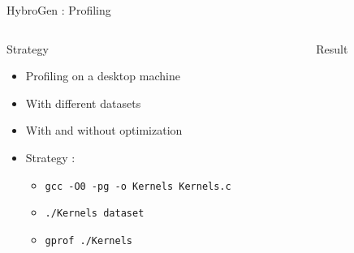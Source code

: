 \begin{Frame}{HybroGen : Profiling}
 \begin{columns}[t]
  \begin{column}{\BWThree}
    \begin{block}{Strategy}
      \begin{itemize}
        \item Profiling on a desktop machine
        \item With different datasets
        \item With and without optimization
        \item Strategy :
          \begin{itemize}
        \item \texttt{gcc -O0 -pg -o Kernels Kernels.c}
        \item \texttt{./Kernels dataset}
        \item \texttt{gprof ./Kernels}
          \end{itemize}
      \end{itemize}
    \end{block}
  \end{column}
  \begin{column}{\BWEight}
    \begin{block}{Result}

    \end{block}
  \end{column}

 \end{columns}
\end{Frame}
